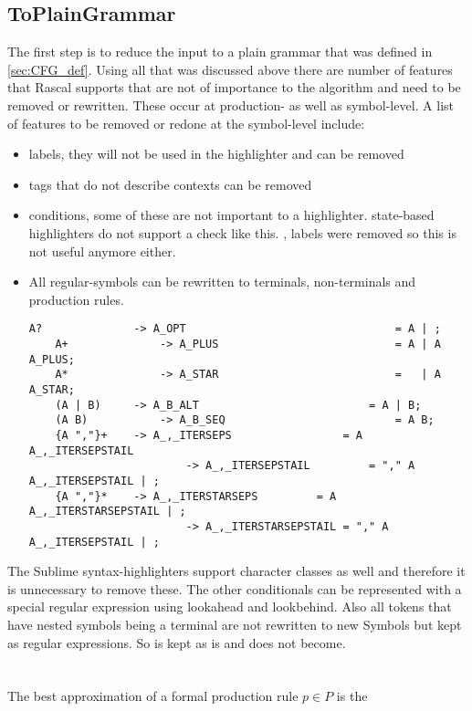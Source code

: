 \subsection{ToPlainGrammar} \label{sec:RascalFeatureToRemove}
The first step is to reduce the input to a plain grammar that was defined in \ref{sec:CFG_def}. Using all that was discussed above there are number of features that Rascal supports that are not of importance to the algorithm and need to be removed or rewritten. These occur at production- as well as symbol-level. A list of features to be removed or redone at the symbol-level include:
\begin{itemize}
\item labels, they will not be used in the highlighter and can be removed
\item tags that do not describe contexts can be removed
\item conditions, some of these are not important to a highlighter.
	\subitem {} state-based highlighters do not support a check like this.
	\subitem \data{\\except(_)}, labels were removed so this is not useful anymore either.
\item All regular-symbols can be rewritten to terminals, non-terminals and production rules.
	\begin{lstlisting}[language=RascalGrammar]
	A?				-> A_OPT 								= A | ;
	A+				-> A_PLUS 							= A | A A_PLUS;
	A*				-> A_STAR 							=   | A A_STAR;
	(A | B)		-> A_B_ALT 							= A | B;
	(A B)			-> A_B_SEQ 							= A B;
	{A ","}+	-> A_,_ITERSEPS 				= A A_,_ITERSEPSTAIL
						-> A_,_ITERSEPSTAIL 		= "," A A_,_ITERSEPSTAIL | ;
	{A ","}*	-> A_,_ITERSTARSEPS 		= A A_,_ITERSTARSEPSTAIL | ;
						-> A_,_ITERSTARSEPSTAIL = "," A A_,_ITERSEPSTAIL | ;\end{lstlisting}
\end{itemize}
The Sublime syntax-highlighters support character classes as well and therefore it is unnecessary to remove these. The other conditionals can be represented with a special regular expression using lookahead and lookbehind. Also all tokens that have nested symbols being a terminal are not rewritten to new Symbols but kept as regular expressions. So \gram{[a-z]+} is kept as is and does not become. \\ \\\\
The best approximation of a formal production rule $p \in P$ is the\\ 
